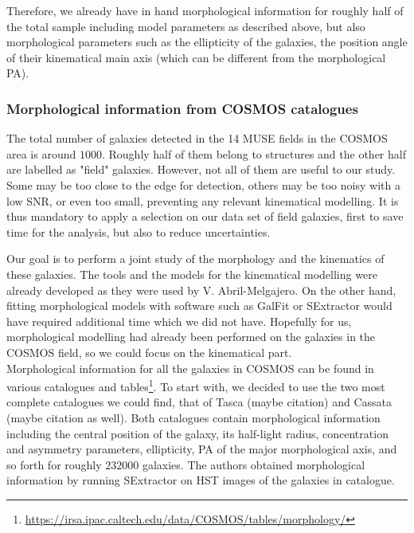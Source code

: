 Therefore, we already have in hand morphological information for roughly half of the total sample including model parameters as described above, but also morphological parameters such as the ellipticity of the galaxies, the position angle of their kinematical main axis (which can be different from the morphological PA).

\subsubsection{Morphological information from COSMOS catalogues}

The total number of galaxies detected in the 14 MUSE fields in the COSMOS area is around $1000$. Roughly half of them belong to structures and the other half are labelled as "field" galaxies. However, not all of them are useful to our study. Some may be too close to the edge for detection, others may be too noisy with a low SNR, or even too small, preventing any relevant kinematical modelling. It is thus mandatory to apply a selection on our data set of field galaxies, first to save time for the analysis, but also to reduce uncertainties.

Our goal is to perform a joint study of the morphology and the kinematics of these galaxies. The tools and the models for the kinematical modelling were already developed as they were used by V. Abril-Melgajero. On the other hand, fitting morphological models with software such as GalFit or SExtractor would have required additional time which we did not have. Hopefully for us, morphological modelling had already been performed on the galaxies in the COSMOS field, so we could focus on the kinematical part. \\

Morphological information for all the galaxies in COSMOS can be found in various catalogues and tables\footnote{\url{https://irsa.ipac.caltech.edu/data/COSMOS/tables/morphology/}}. To start with, we decided to use the two most complete catalogues we could find, that of Tasca (maybe citation) and Cassata (maybe citation as well). Both catalogues contain morphological information including the central position of the galaxy, its half-light radius, concentration and asymmetry parameters, ellipticity, PA of the major morphological axis, and so forth for roughly $232 000$ galaxies. The authors obtained morphological information by running SExtractor on HST images of the galaxies in  catalogue. \\

